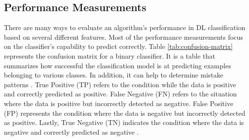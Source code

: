 \documentclass[12pt]{diazessay}
\begin{document}
    
    
    \subsection{Performance Measurements}
    \hspace{0.7cm} There are many ways to evaluate an algorithm's performance in DL classification based on several different features. Most of the performance measurements focus on the classifier's capability to predict correctly. Table \ref{tab:confusion-matrix} represents the confusion matrix for a binary classifier. It is a table that summarizes how successful the classification model is at predicting examples belonging to various classes. In addition, it can help to determine mistake patterns \cite{Burkov2019-rd}. True Positive (TP) refers to the condition while the data is positive and correctly predicted as positive. False Negative (FN) refers to the situation where the data is positive but incorrectly detected as negative. False Positive (FP) represents the condition where the data is negative but incorrectly detected as positive. Lastly, True Negative (TN) indicates the condition where the data is negative and correctly predicted as negative \cite{fu2020convolutional}.
    
    \begin{table}[H]
    \centering
     \caption{Confusion Matrix.}
     \label{tab:confusion-matrix}
    \end{table}
\end{document}
